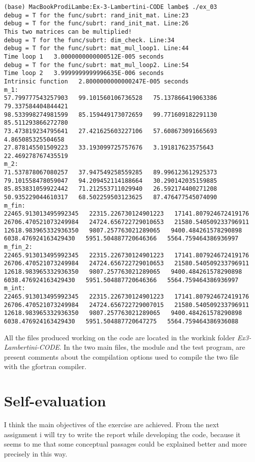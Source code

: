 \documentclass[prb,9pt,notitlepage]{revtex4-1}
\begin{document}
\begin{lstlisting}
(base) MacBookProdiLambe:Ex-3-Lambertini-CODE lambe$ ./ex_03
debug = T for the func/subrt: rand_init_mat. Line:23
debug = T for the func/subrt: rand_init_mat. Line:26
This two matrices can be multiplied!
debug = T for the func/subrt: dim_check. Line:34
debug = T for the func/subrt: mat_mul_loop1. Line:44
Time loop 1   3.0000000000000512E-005 seconds
debug = T for the func/subrt: mat_mul_loop2. Line:54
Time loop 2   3.9999999999996635E-006 seconds
Intrinsic function   2.8000000000000247E-005 seconds
m_1:
57.799777543257903   99.101560106736528   75.137866419063386   79.337584404844421
98.533998274981599   85.159449173072659   99.771609182291130   85.511293866272780
73.473819234795641   27.421625603227106   57.608673091665693   4.865085325504658
27.878145501509223   33.193099725757676   3.191817623575643   22.469278767435519
m_2:
71.537878067080257   37.947549258559285   89.996123612925373
79.101558478059047   94.209452114188664   30.290142035159885
85.853831059922442   71.212553711029940   26.592174400271208
50.935229044610317   68.502259503123625   87.476477545074090
m_fin:
22465.913013495992345   22315.226730124901223   17141.807924672419176
26706.470521073249984   24724.656722729010653   21580.540509233796911
12618.983965332936350   9807.257763021289065   9400.484261578290898
6038.476924163429430   5951.504887720646366   5564.759464386936997
m_fin_2:
22465.913013495992345   22315.226730124901223   17141.807924672419176
26706.470521073249984   24724.656722729010653   21580.540509233796911
12618.983965332936350   9807.257763021289065   9400.484261578290898
6038.476924163429430   5951.504887720646366   5564.759464386936997
m_int:
22465.913013495992345   22315.226730124901223   17141.807924672419176
26706.470521073249984   24724.656722729007015   21580.540509233796911
12618.983965332936350   9807.257763021289065   9400.484261578290898
6038.476924163429430   5951.504887720647275   5564.759464386936088

\end{lstlisting}

All the files produced working on the code are located in the workink folder \textit{Ex3-Lambertini-CODE}. In the two main files, the module and the test program, are present comments about the compilation options used to compile the two file with the gfortran compiler.

\section{Self-evaluation}
I think the main objectives of the exercise are achieved. From the next assignment i will try to write the report while developing the code, because it seems to me that some conceptual passages could be explained better and more precisely in this way.
\end{document}
